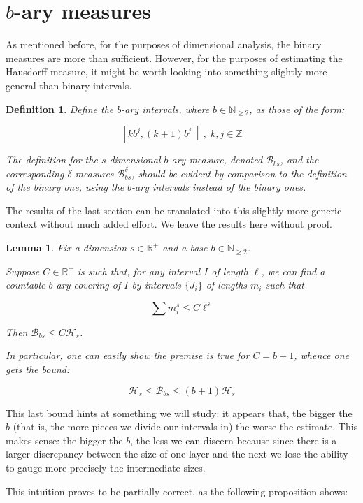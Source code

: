 \documentclass[11pt, reqno]{amsart}
\newcommand{\R}{\mathbb{R}}
\newcommand{\Z}{\mathbb{Z}}
\newcommand{\N}{\mathbb{N}}
\newcommand{\HH}{\mathcal{H}}
\newcommand{\BB}{\mathcal{B}}
\newtheorem{lemma}{Lemma}
\newtheorem{definition}{Definition}
\begin{document}
\section{$b$-ary measures}\label{sectgenbmeasures}

As mentioned before, for the purposes of dimensional analysis, the binary measures are more than sufficient. However, for the purposes of estimating the Hausdorff measure, it might be worth looking into something slightly more general than binary intervals.

\begin{definition}
Define the $b$-ary intervals, where $b \in \N_{\geq 2}$, as those of the form:

\[\left[k b^j, (k+1) b^j \right[, \;k, j \in \Z\]

The definition for the $s$-dimensional $b$-ary measure, denoted $\BB_{bs}$, and the corresponding $\delta$-measures $\BB_{bs}^\delta$, should be evident by comparison to the definition of the binary one, using the $b$-ary intervals instead of the binary ones.
\end{definition}

The results of the last section can be translated into this slightly more generic context without much added effort. We leave the results here without proof.

\begin{lemma}
Fix a dimension $s \in \R^+$ and a base $b \in \N_{\geq 2}$.

Suppose $C \in \R^+$ is such that, for any interval $I$ of length $\ell$, we can find a countable $b$-ary covering of $I$ by intervals $\{J_i\}$ of lengths $m_i$ such that

\[\sum m_i^s \leq C \ell^s\]

Then $\BB_{bs} \leq C \HH_s$.

In particular, one can easily show the premise is true for $C = b+1$, whence one gets the bound:

\[\HH_s \leq \BB_{bs} \leq (b+1) \HH_s\]
\end{lemma}

This last bound hints at something we will study: it appears that, the bigger the $b$ (that is, the more pieces we divide our intervals in) the worse the estimate. This makes sense: the bigger the $b$, the less we can discern because since there is a larger discrepancy between the size of one layer and the next we lose the ability to gauge more precisely the intermediate sizes.

This intuition proves to be partially correct, as the following proposition shows:
\end{document}
